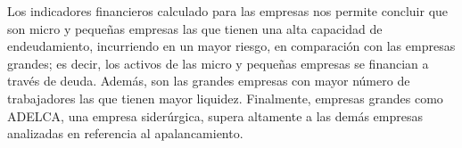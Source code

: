\documentclass[
]{article}
\begin{document}
Los indicadores financieros calculado para las empresas nos permite
concluir que son micro y pequeñas empresas las que tienen una alta
capacidad de endeudamiento, incurriendo en un mayor riesgo, en
comparación con las empresas grandes; es decir, los activos de las micro
y pequeñas empresas se financian a través de deuda. Además, son las
grandes empresas con mayor número de trabajadores las que tienen mayor
liquidez. Finalmente, empresas grandes como ADELCA, una empresa
siderúrgica, supera altamente a las demás empresas analizadas en
referencia al apalancamiento.
\end{document}
